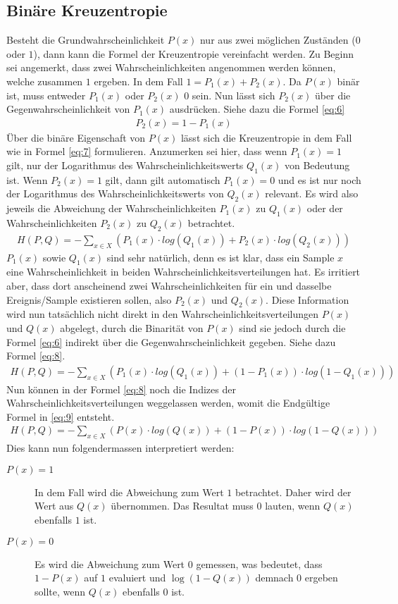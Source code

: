 \subsection{Binäre Kreuzentropie}\label{anhang:binary:kreuzentropie}
Besteht die Grundwahrscheinlichkeit $P(x)$ nur aus zwei möglichen Zuständen ($0$ oder $1$), dann kann die Formel der Kreuzentropie
vereinfacht werden. Zu Beginn sei angemerkt, dass zwei Wahrscheinlichkeiten angenommen werden können, welche zusammen
$1$ ergeben. In dem Fall $1 = P_1(x) + P_2(x)$. Da $P(x)$ binär ist, muss entweder $P_1(x)$ oder $P_2(x)$ $0$ sein.
Nun lässt sich $P_2(x)$ über die Gegenwahrscheinlichkeit von $P_1(x)$ ausdrücken. Siehe dazu die Formel \ref{eq:6}
\begin{align}
    P_2(x) = 1 - P_1(x)\label{eq:6}
\end{align}
Über die binäre Eigenschaft von $P(x)$ lässt sich die Kreuzentropie in dem Fall wie in Formel \ref{eq:7} formulieren.
Anzumerken sei hier, dass wenn $P_1(x) = 1$ gilt, nur der Logarithmus des Wahrscheinlichkeitswerts $Q_1(x)$ von Bedeutung ist.
Wenn $P_2(x) = 1$ gilt, dann gilt automatisch $P_1(x) = 0$ und es ist nur noch der Logarithmus des Wahrscheinlichkeitswerts von
$Q_2(x)$ relevant. Es wird also jeweils die Abweichung der Wahrscheinlichkeiten $P_1(x)$ zu $Q_1(x)$ oder der Wahrscheinlichkeiten
$P_2(x)$ zu $Q_2(x)$ betrachtet.
\begin{align}
    H(P,Q) = - \sum_{x \in X} (P_1(x) \cdot log(Q_1(x)) + P_2(x) \cdot log(Q_2(x)))\label{eq:7}
\end{align}
$P_1(x)$ sowie $Q_1(x)$ sind sehr natürlich, denn es ist klar, dass ein Sample $x$ eine Wahrscheinlichkeit
in beiden Wahrscheinlichkeitsverteilungen hat. Es irritiert aber, dass dort anscheinend zwei Wahrscheinlichkeiten für ein und
dasselbe Ereignis/Sample existieren sollen, also $P_2(x)$ und $Q_2(x)$. Diese Information wird nun tatsächlich nicht direkt in den
Wahrscheinlichkeitsverteilungen $P(x)$ und $Q(x)$ abgelegt, durch die Binarität von $P(x)$ sind sie jedoch durch die Formel
\ref{eq:6} indirekt über die Gegenwahrscheinlichkeit gegeben. Siehe dazu Formel \ref{eq:8}.
\begin{align}
    H(P,Q) = - \sum_{x \in X} (P_1(x) \cdot log(Q_1(x)) + (1 - P_1(x)) \cdot log(1 - Q_1(x)))\label{eq:8}
\end{align}
Nun können in der Formel \ref{eq:8} noch die Indizes der Wahrscheinlichkeitsverteilungen weggelassen werden, womit
die Endgültige Formel in \ref{eq:9} entsteht.
\begin{align}
    H(P,Q) = - \sum_{x \in X} (P(x) \cdot log(Q(x)) + (1 - P(x)) \cdot log(1 - Q(x)))\label{eq:9}
\end{align}
Dies kann nun folgendermassen interpretiert werden:
\begin{description}
    \item[$P(x) = 1$] In dem Fall wird die Abweichung zum Wert $1$ betrachtet. Daher wird der Wert aus $Q(x)$ übernommen.
    Das Resultat muss $0$ lauten, wenn $Q(x)$ ebenfalls $1$ ist.
    \item[$P(x) = 0$] Es wird die Abweichung zum Wert $0$ gemessen, was bedeutet, dass $1 - P(x)$ auf $1$ evaluiert und
    $\log(1 - Q(x))$ demnach $0$ ergeben sollte, wenn $Q(x)$ ebenfalls $0$ ist.
\end{description}

